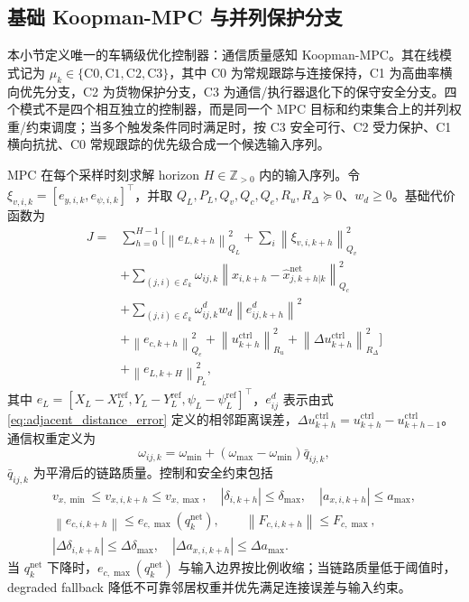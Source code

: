 \documentclass[twocolumn,3p,times,procedia]{elsarticle}
\newcommand{\norm}[1]{\left\lVert #1 \right\rVert}
\begin{document}
\subsection{基础 Koopman-MPC 与并列保护分支}

本小节定义唯一的车辆级优化控制器：通信质量感知 Koopman-MPC。其在线模式记为 $\mu_k\in\{\mathrm{C0},\mathrm{C1},\mathrm{C2},\mathrm{C3}\}$，其中 C0 为常规跟踪与连接保持，C1 为高曲率横向优先分支，C2 为货物保护分支，C3 为通信/执行器退化下的保守安全分支。四个模式不是四个相互独立的控制器，而是同一个 MPC 目标和约束集合上的并列权重/约束调度；当多个触发条件同时满足时，按 C3 安全可行、C2 受力保护、C1 横向抗扰、C0 常规跟踪的优先级合成一个候选输入序列。

MPC 在每个采样时刻求解 horizon $H\in\mathbb Z_{>0}$ 内的输入序列。令 $\xi_{v,i,k}=[e_{y,i,k},e_{\psi,i,k}]^\top$，并取 $Q_L,P_L,Q_v,Q_c,Q_e,R_u,R_\Delta\succeq0$、$w_d\ge0$。基础代价函数为
\begin{equation}
\begin{aligned}
J=&\sum_{h=0}^{H-1}
\Big[
\norm{e_{L,k+h}}_{Q_L}^2+
\sum_i\norm{\xi_{v,i,k+h}}_{Q_v}^2\\
&+\sum_{(j,i)\in\mathcal E_k}\omega_{ij,k}\norm{x_{i,k+h}-\hat x_{j,k+h|k}^{\mathrm{net}}}_{Q_c}^2\\
&+\sum_{(j,i)\in\mathcal E_k}\omega^d_{ij,k}w_d\norm{e^d_{ij,k+h}}^2\\
&+\norm{e_{c,k+h}}_{Q_e}^2+
\norm{u_{k+h}^{\mathrm{ctrl}}}_{R_u}^2+
\norm{\Delta u_{k+h}^{\mathrm{ctrl}}}_{R_\Delta}^2
\Big]\\
&+\norm{e_{L,k+H}}_{P_L}^2 ,
\end{aligned}
\label{eq:mpc_cost}
\end{equation}
其中 $e_L=[X_L-X_L^{\mathrm{ref}},Y_L-Y_L^{\mathrm{ref}},\psi_L-\psi_L^{\mathrm{ref}}]^\top$，$e^d_{ij}$ 表示由式 \eqref{eq:adjacent_distance_error} 定义的相邻距离误差，$\Delta u_{k+h}^{\mathrm{ctrl}}=u_{k+h}^{\mathrm{ctrl}}-u_{k+h-1}^{\mathrm{ctrl}}$。通信权重定义为
\begin{equation}
\omega_{ij,k}=\omega_{\min}+(\omega_{\max}-\omega_{\min})\bar q_{ij,k},
\label{eq:comm_weight}
\end{equation}
$\bar q_{ij,k}$ 为平滑后的链路质量。控制和安全约束包括
\begin{equation}
\begin{gathered}
v_{x,\min}\le v_{x,i,k+h}\le v_{x,\max},\quad
|\delta_{i,k+h}|\le\delta_{\max},\quad
|a_{x,i,k+h}|\le a_{\max},\\
\norm{e_{c,i,k+h}}\le e_{c,\max}(q_k^{\mathrm{net}}),\qquad
\norm{F_{c,i,k+h}}\le F_{c,\max},\\
|\Delta \delta_{i,k+h}|\le \Delta\delta_{\max},\quad
|\Delta a_{x,i,k+h}|\le \Delta a_{\max}.
\end{gathered}
\label{eq:constraints}
\end{equation}
当 $q_k^{\mathrm{net}}$ 下降时，$e_{c,\max}(q_k^{\mathrm{net}})$ 与输入边界按比例收缩；当链路质量低于阈值时，degraded fallback 降低不可靠邻居权重并优先满足连接误差与输入约束。
\end{document}
